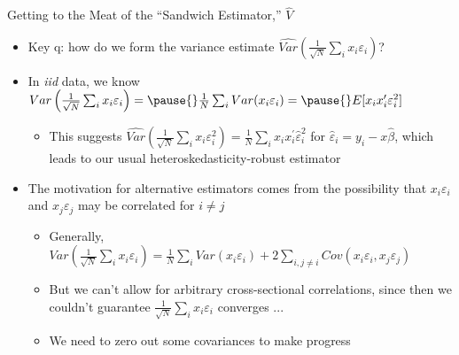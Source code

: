 \documentclass[11pt,english]{beamer}
\begin{document}
\begin{frame}{Getting to the Meat of the ``Sandwich Estimator,'' $\hat{V}$}

\begin{itemize}
\item Key q: how do we form the variance estimate $\widehat{Var}\left(\frac{1}{\sqrt{N}}\sum_i x_i\varepsilon_i\right)$?\bigskip\pause{}

\item In \emph{iid} data, we know $Var\left(\frac{1}{\sqrt{N}}\sum_i x_i\varepsilon_i\right)=\pause{}\frac{1}{N}\sum_i Var(x_i\varepsilon_i)=\pause{}E[x_ix_i^\prime\varepsilon_i^2]$\smallskip
\begin{itemize}\pause{}
\item This suggests $\widehat{Var}\left(\frac{1}{\sqrt{N}}\sum_i x_i\varepsilon_i^2\right)=\frac{1}{N}\sum_ix_ix_i^\prime\hat\varepsilon_i^2$ for $\hat\varepsilon_i=y_i-x\hat\beta$, which leads to our usual heteroskedasticity-robust estimator
\end{itemize}\bigskip\pause{}

\item The motivation for alternative estimators comes from the possibility that $x_i\varepsilon_i$ and $x_j\varepsilon_j$ may be correlated for $i\neq j$\smallskip
\begin{itemize}
\item Generally,  $Var\left(\frac{1}{\sqrt{N}}\sum_i x_i\varepsilon_i\right)=\frac{1}{N}\sum _i Var(x_i\varepsilon_i)+2\sum_{i,j\neq i}Cov(x_i\varepsilon_i,x_j\varepsilon_j)$\smallskip\pause{}
\item But we can't allow for arbitrary cross-sectional correlations, since then we couldn't guarantee $\frac{1}{\sqrt{N}}\sum_i x_i\varepsilon_i$ converges ... \smallskip\pause{}
\item We need to zero out some covariances to make progress
\end{itemize}
\end{itemize}
\end{frame}
\end{document}

